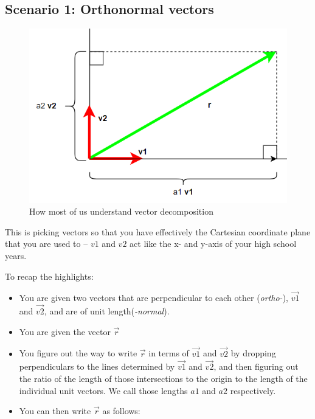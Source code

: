 \documentclass[
]{book}
\providecommand{\tightlist}{%
  \setlength{\itemsep}{0pt}\setlength{\parskip}{0pt}}
\begin{document}
\hypertarget{scenario-1-orthonormal-vectors}{%
\subsection{Scenario 1: Orthonormal vectors}\label{scenario-1-orthonormal-vectors}}

\begin{figure}

{\centering \includegraphics[width=0.75\linewidth,height=0.75\textheight]{images/orthonormal-decomposition} 

}

\caption{How most of us understand vector decomposition}\label{fig:unnamed-chunk-6}
\end{figure}

This is picking vectors so that you have effectively the Cartesian coordinate plane that you are used to -- \(v1\) and \(v2\) act like the x- and y-axis of your high school years.

To recap the highlights:

\begin{itemize}
\tightlist
\item
  You are given two vectors that are perpendicular to each other (\emph{ortho-}), \(\vec{v1}\) and \(\vec{v2}\), and are of unit length(\emph{-normal}).
\item
  You are given the vector \(\vec{r}\)
\item
  You figure out the way to write \(\vec{r}\) in terms of \(\vec{v1}\) and \(\vec{v2}\) by dropping perpendiculars to the lines determined by \(\vec{v1}\) and \(\vec{v2}\), and then figuring out the ratio of the length of those intersections to the origin to the length of the individual unit vectors. We call those lengths \(a1\) and \(a2\) respectively.
\item
  You can then write \(\vec{r}\) as follows:
\end{itemize}
\end{document}
